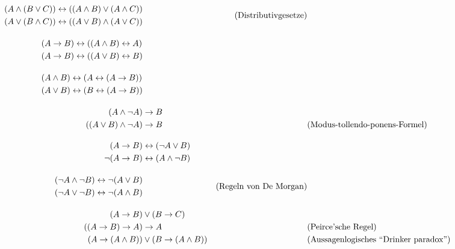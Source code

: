 \documentclass[12pt,BCOR1cm,ngerman,DIV15,fleqn,chapterprefix,headings=small]{ST1-book}
\begin{document}
\begin{align*}
  \begin{split} (A \land (B \lor C)) & \leftrightarrow ((A \land B) \lor (A \land C)) \\
   (A \lor (B \land C)) & \leftrightarrow ((A \lor B) \land (A \lor C)) \end{split} && ( \text{Distributivgesetze}) \\[1em]
  \begin{split} (A \to B) & \leftrightarrow ((A \land B) \leftrightarrow A) \\
(A \to B) & \leftrightarrow ((A \lor B) \leftrightarrow B)
    \end{split} &&  \\[1em]
  \begin{split}         (A \land B) & \leftrightarrow (A \leftrightarrow (A\to B)) \\
    (A \lor B) & \leftrightarrow (B \leftrightarrow (A\to B))
    \end{split} &&  \\[1em]
                (A\land \neg A) & \to B \\ %
    ((A\lor B) \land \neg A) & \to B && (\text{Modus-tollendo-ponens-Formel})\\[1em]
  (A\to B) & \leftrightarrow (\neg A \lor B) \\
  \neg (A\to B) & \leftrightarrow (A \land \neg B) \\[1em]
       \begin{split} ( \neg A \land \neg B) & \leftrightarrow \neg (A \lor B) \\
  (\neg A \lor \neg B) & \leftrightarrow \neg(A \land B) 
  \end{split} && (\text{Regeln von De Morgan}) \\[1em]
      (A\to B) & \lor (B\to C) \\
      ((A\to B)\to A) & \to A && (\text{Peirce’sche Regel}) \\
    (A \to(A\land B)) & \lor (B\to (A\land B)) &&  (\text{Aussagenlogisches }``\text{Drinker paradox}")
 \end{align*}
 \endgroup
\end{document}
